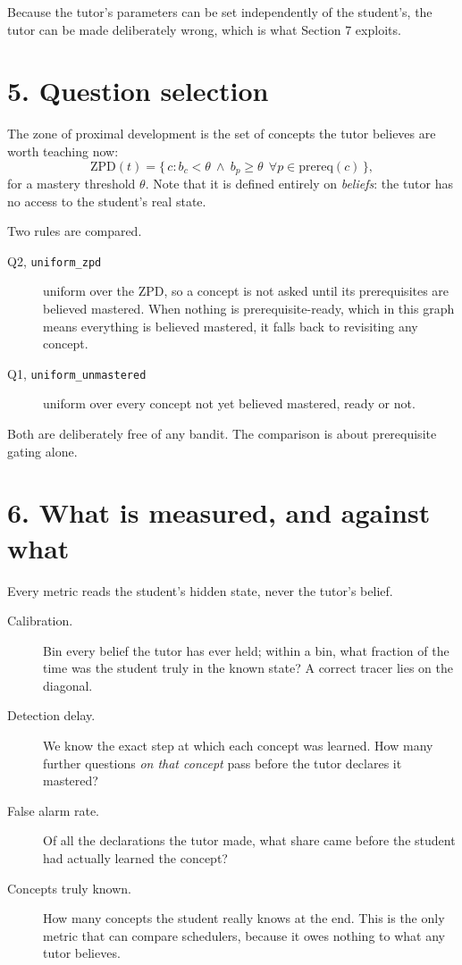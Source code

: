 \documentclass[11pt]{article}
\newcommand{\code}[1]{\texttt{\small #1}}
\begin{document}
Because the tutor's parameters can be set independently of the student's, the
tutor can be made deliberately wrong, which is what Section 7 exploits.

\section*{5. Question selection}

The zone of proximal development is the set of concepts the tutor believes are
worth teaching now:
\begin{equation}
\mathrm{ZPD}(t) = \{\,c : b_c < \theta \ \wedge\ b_p \ge \theta \ \ \forall p
\in \mathrm{prereq}(c)\,\},
\end{equation}
for a mastery threshold $\theta$. Note that it is defined entirely on
\emph{beliefs}: the tutor has no access to the student's real state.

Two rules are compared.

\begin{description}
\item[Q2, \code{uniform\_zpd}] uniform over the ZPD, so a concept is not asked
until its prerequisites are believed mastered. When nothing is
prerequisite-ready, which in this graph means everything is believed mastered,
it falls back to revisiting any concept.
\item[Q1, \code{uniform\_unmastered}] uniform over every concept not yet
believed mastered, ready or not.
\end{description}

Both are deliberately free of any bandit. The comparison is about
prerequisite gating alone.

\section*{6. What is measured, and against what}

Every metric reads the student's hidden state, never the tutor's belief.

\begin{description}
\item[Calibration.] Bin every belief the tutor has ever held; within a bin,
what fraction of the time was the student truly in the known state? A correct
tracer lies on the diagonal.
\item[Detection delay.] We know the exact step at which each concept was
learned. How many further questions \emph{on that concept} pass before the
tutor declares it mastered?
\item[False alarm rate.] Of all the declarations the tutor made, what share
came before the student had actually learned the concept?
\item[Concepts truly known.] How many concepts the student really knows at the
end. This is the only metric that can compare schedulers, because it owes
nothing to what any tutor believes.
\end{description}
\end{document}

